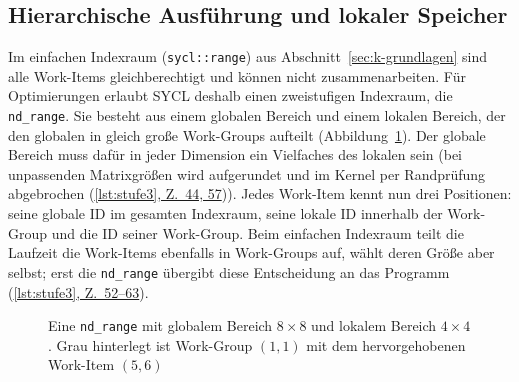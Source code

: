 \documentclass[12pt,a4paper]{article}
\newcommand{\stelle}[2]{(\hyperref[#1]{\ref*{#1}, Z.~#2})}
\begin{document}
\subsection{Hierarchische Ausführung und lokaler Speicher}\label{sec:k-hierarchie}

Im einfachen Indexraum (\texttt{sycl::range}) aus Abschnitt~\ref{sec:k-grundlagen}
sind alle Work-Items gleichberechtigt und können nicht zusammenarbeiten. Für
Optimierungen erlaubt SYCL deshalb einen zweistufigen Indexraum, die
\texttt{nd\_range}. Sie besteht aus einem globalen Bereich und einem lokalen
Bereich, der den globalen in gleich große Work-Groups aufteilt
(Abbildung~\ref{fig:ndrange}). Der globale Bereich muss dafür in jeder Dimension
ein Vielfaches des lokalen sein (bei unpassenden Matrixgrößen wird aufgerundet
und im Kernel per Randprüfung abgebrochen \stelle{lst:stufe3}{44, 57}). Jedes
Work-Item kennt nun drei Positionen: seine globale ID im gesamten Indexraum,
seine lokale ID innerhalb der Work-Group und die ID seiner Work-Group. Beim
einfachen Indexraum teilt die Laufzeit die Work-Items ebenfalls in Work-Groups
auf, wählt deren Größe aber selbst; erst die \texttt{nd\_range} übergibt diese
Entscheidung an das Programm \stelle{lst:stufe3}{52--63}.

\begin{figure}[htbp]
\centering
{}
\caption[Aufbau einer \texttt{nd\_range}]{Eine \texttt{nd\_range} mit globalem Bereich $8 \times 8$ und lokalem Bereich $4 \times 4$. Grau hinterlegt ist Work-Group $(1,1)$ mit dem hervorgehobenen Work-Item $(5,6)$}
\label{fig:ndrange}
\end{figure}
\end{document}
